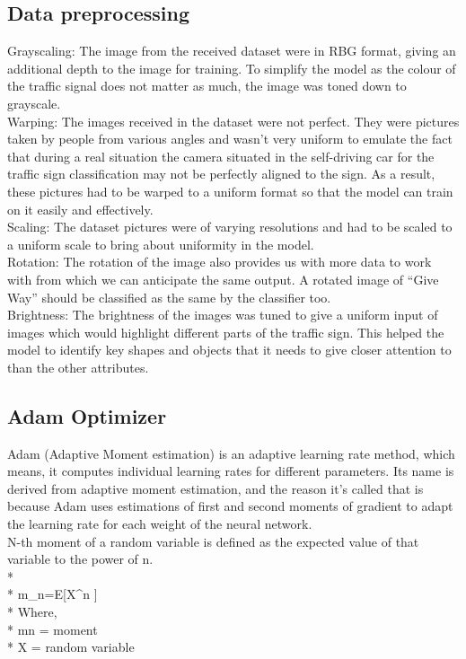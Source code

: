 \documentclass{article}
\begin{document}
\subsection{Data preprocessing}
\label{ssec:subhead}
Grayscaling: The image from the received dataset were in RBG format, giving an additional depth to the image for training. To simplify the model as the colour of the traffic signal does not matter as much, the image was toned down to grayscale.\\
Warping: The images received in the dataset were not perfect. They were pictures taken by people from various angles and wasn’t very uniform to emulate the fact that during a real situation the camera situated in the self-driving car for the traffic sign classification may not be perfectly aligned to the sign. As a result, these pictures had to be warped to a uniform format so that the model can train on it easily and effectively.\\
Scaling: The dataset pictures were of varying resolutions and had to be scaled to a uniform scale to bring about uniformity in the model.\\
Rotation: The rotation of the image also provides us with more data to work with from which we can anticipate the same output. A rotated image of “Give Way” should be classified as the same by the classifier too.\\
Brightness: The brightness of the images was tuned to give a uniform input of images which would highlight different parts of the traffic sign. This helped the model to identify key shapes and objects that it needs to give closer attention to than the other attributes.

\subsection{Adam Optimizer}
\label{ssec:subhead}

Adam (Adaptive Moment estimation) is an adaptive learning rate method, which means, it computes individual learning rates for different parameters. Its name is derived from adaptive moment estimation, and the reason it’s called that is because Adam uses estimations of first and second moments of gradient to adapt the learning rate for each weight of the neural network.\\
N-th moment of a random variable is defined as the expected value of that variable to the power of n.\\*
\\*
m_n=E[X^n ]\\*
Where, \\*
mn = moment\\*
X = random variable\\
\end{document}
